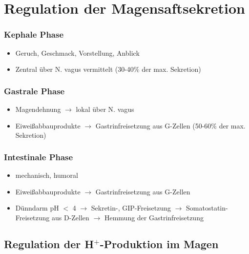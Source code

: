 \documentclass[10pt,a4paper]{report}
\begin{document}
\section{Regulation der Magensaftsekretion} %
\label{sec:regulation_der_magensaftsekretion}
\subsubsection{Kephale Phase} %
\label{sub:kephale_phase}
\begin{itemize}
	\item Geruch, Geschmack, Vorstellung, Anblick
	\item Zentral über N. vagus vermittelt (30-40\% der max. Sekretion)
\end{itemize}
\subsubsection{Gastrale Phase} %
\label{ssub:gastrale_phase}
\begin{itemize}
	\item Magendehnung $\rightarrow$ lokal über N. vagus
	\item Eiweißabbauprodukte $\rightarrow$ Gastrinfreisetzung aus G-Zellen
	(50-60\% der max. Sekretion)
\end{itemize}
\subsubsection{Intestinale Phase} %
\label{ssub:intestinale_phase}
\begin{itemize}
	\item mechanisch, humoral
	\item Eiweißabbauprodukte $\rightarrow$ Gastrinfreisetzung aus G-Zellen 
	\item Dünndarm pH $<$ 4 $\rightarrow$ Sekretin-, GIP-Freisetzung $\rightarrow$ Somatostatin-Freisetzung aus D-Zellen $\rightarrow$ Hemmung der Gastrinfreisetzung 
\end{itemize}
	
\subsection{Regulation der H$^+$-Produktion im Magen} %
\label{sub:regulation_der_}

\end{document}
